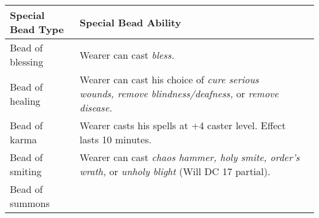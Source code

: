 \begin{longtable}{llll}
\hline
\multicolumn{1}{|p{0.891in}|}{\begin{minipage}[t]{0.891in}\raggedright
\textbf{Special Bead Type}\end{minipage}} & \multicolumn{1}{p{3.523in}|}{\begin{minipage}[t]{3.523in}\raggedright
\textbf{Special Bead Ability}\end{minipage}}\\
\hline
\multicolumn{1}{p{0.043in}|}{\begin{minipage}[t]{0.043in}\raggedright
Bead of blessing\end{minipage}} & \multicolumn{1}{p{0.043in}|}{\begin{minipage}[t]{0.043in}\raggedright
Wearer can cast \textit{bless.}\end{minipage}}\\
\hline
\multicolumn{1}{|p{0.891in}|}{\begin{minipage}[t]{0.891in}\raggedright
Bead of healing\end{minipage}} & \multicolumn{1}{p{3.523in}|}{\begin{minipage}[t]{3.523in}\raggedright
Wearer can cast his choice of \textit{cure serious wounds, remove blindness/deafness, 
}or \textit{remove disease.}\end{minipage}}\\
\hline
\multicolumn{1}{p{0.043in}|}{\begin{minipage}[t]{0.043in}\raggedright
Bead of karma\end{minipage}} & \multicolumn{1}{p{0.043in}|}{\begin{minipage}[t]{0.043in}\raggedright
Wearer casts his spells at +4 caster level. Effect lasts 10 minutes.\end{minipage}}\\
\hline
\multicolumn{1}{|p{0.891in}|}{\begin{minipage}[t]{0.891in}\raggedright
Bead of smiting\end{minipage}} & \multicolumn{3}{p{3.609in}|}{\begin{minipage}[t]{3.609in}\raggedright
Wearer can cast \textit{chaos hammer, holy smite, order's wrath, }or \textit{unholy 
blight }(Will DC 17 partial).\end{minipage}}\\
\hline
\multicolumn{1}{p{0.043in}|}{\begin{minipage}[t]{0.043in}\raggedright
Bead of summons\end{minipage}} & \multicolumn{1}{p{0.043in}|}{\begin{minipage}[t]{0.043in}\raggedright

\end{minipage}}
\end{longtable}
